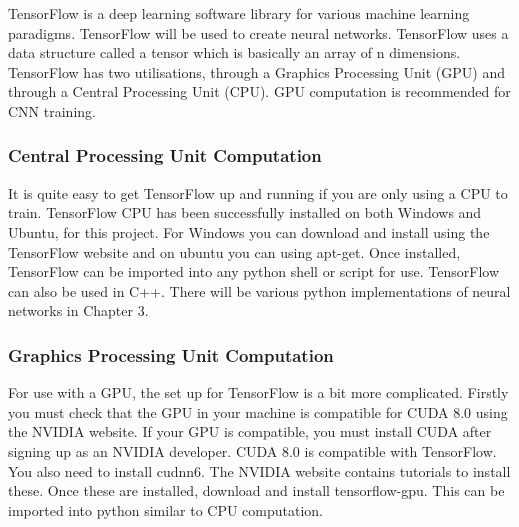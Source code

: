 TensorFlow is a deep learning software library for various machine learning paradigms. TensorFlow will be used to create neural networks.
TensorFlow uses a data structure called a tensor which is basically an array of n dimensions.
TensorFlow has two utilisations, through a Graphics Processing Unit (GPU) and through a Central Processing Unit (CPU).
GPU computation is recommended for CNN training. 

\tocless\subsubsection{Central Processing Unit Computation}
It is quite easy to get TensorFlow up and running if you are only using a CPU to
train. TensorFlow CPU has been successfully installed on both Windows and Ubuntu, for this project.
For Windows you can download and install using the TensorFlow website and on ubuntu you can
using apt-get. Once installed, TensorFlow can be imported into any python shell
or script for use. TensorFlow can also be used in C++. There will be various
python implementations of neural networks in Chapter 3.

\tocless\subsubsection{Graphics Processing Unit Computation}
For use with a GPU, the set up for TensorFlow is a bit more complicated. Firstly
you must check that the GPU in your machine is compatible for CUDA 8.0 using the
NVIDIA website. If your GPU is compatible, you must install CUDA after signing
up as an NVIDIA developer. CUDA 8.0 is compatible with TensorFlow.
You also need to install cudnn6.
The NVIDIA website contains tutorials to install these.
Once these are installed, download and install tensorflow-gpu.
This can be imported into python similar to CPU computation.
